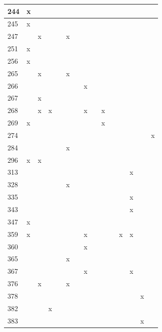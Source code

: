 \begin{landscape}
\begin{longtable}{|p{0.2in}|p{0.3in}|p{0.41in}|p{0.4in}|p{0.3in}|p{0.31in}|p{0.3in}|p{0.3in}|p{0.375in}|p{0.3in}|p{0.3in}|p{0.35in}|p{0.35in}|p{0.4in}|p{0.3in}|}
   244 & x &  &  &  &  &  &  &  &  &  &  &  &  &  \\  \hline
   245 & x &  &  &  &  &  &  &  &  &  &  &  &  &  \\  \hline
   247 &  & x &  &  & x &  &  &  &  &  &  &  &  &  \\  \hline
   251 & x &  &  &  &  &  &  &  &  &  &  &  &  &  \\  \hline
   256 & x &  &  &  &  &  &  &  &  &  &  &  &  &  \\  \hline
   265 &  & x &  &  & x &  &  &  &  &  &  &  &  &  \\  \hline
   266 &  &  &  &  &  &  & x &  &  &  &  &  &  &  \\  \hline
   267 &  & x &  &  &  &  &  &  &  &  &  &  &  &  \\  \hline
   268 &  & x & x &  &  &  & x &  & x &  &  &  &  &  \\  \hline
   269 & x &  &  &  &  &  &  &  & x &  &  &  &  &  \\  \hline
   274 &  &  &  &  &  &  &  &  &  &  &  &  &  & x \\  \hline
   284 &  &  &  &  & x &  &  &  &  &  &  &  &  &  \\  \hline
   296 & x & x &  &  &  &  &  &  &  &  &  &  &  &  \\  \hline
   313 &  &  &  &  &  &  &  &  &  &  &  & x &  &  \\  \hline
   328 &  &  &  &  & x &  &  &  &  &  &  &  &  &  \\  \hline
   335 &  &  &  &  &  &  &  &  &  &  &  & x &  &  \\  \hline
   343 &  &  &  &  &  &  &  &  &  &  &  & x &  &  \\  \hline
   347 & x &  &  &  &  &  &  &  &  &  &  &  &  &  \\  \hline
   359 & x &  &  &  &  &  & x &  &  &  & x & x &  &  \\  \hline
  360 &  &  &  &  &  &  & x &  &  &  &  &  &  &  \\  \hline
   365 &  &  &  &  & x &  &  &   &   &   &  &  &  &   \\  \hline
   367 &  &  &  &  &  &  & x &  &  &  &  & x &  &   \\  \hline
   376 &  & x &  &  & x &  &  &   &   &   &  &  &  &   \\  \hline
  378 &  &  &  &  &  &  &  &  &  &  &  &  & x &  \\  \hline
   382 &  &  & x &  &  &  &  &  &  &  &  &  &  &  \\  \hline
   383 &  &  &  &  &  &  &  &  &  &  &  &  & x &  \\  \hline

\end{longtable}
\end{landscape}
